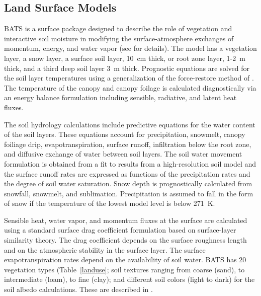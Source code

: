 \subsection{Land Surface Models}

 BATS is a surface package designed to describe
the role of vegetation and interactive soil moisture in modifying the
surface-atmosphere exchanges of momentum, energy, and water vapor (see
\cite{Dickinson_93} for details).  The model has a vegetation layer, a snow
layer, a surface soil layer, 10~cm thick, or root zone layer, 1-2~m thick, and a
third deep soil layer 3~m thick.  Prognostic equations are solved for the soil
layer temperatures using a generalization of the force-restore method of
\cite{Deardoff_78}.  The temperature of the canopy and canopy foilage is
calculated diagnostically via an energy balance formulation including sensible,
radiative, and latent heat fluxes.

The soil hydrology calculations include predictive equations for the water
content of the soil layers.  These equations account for precipitation,
snowmelt, canopy foiliage drip, evapotranspiration, surface runoff, infiltration
below the root zone, and diffusive exchange of water between soil layers.  The
soil water movement formulation is obtained from a fit to results from a
high-resolution soil model \cite{Dickinson_84} and the surface runoff rates are
expressed as functions of the precipitation rates and the degree of soil water
saturation.  Snow depth is prognostically calculated from snowfall, snowmelt,
and sublimation.  Precipitation is assumed to fall in the form of snow if the
temperature of the lowest model level is below 271~K.

Sensible heat, water vapor, and momentum fluxes at the surface are calculated
using a standard surface drag coefficient formulation based on surface-layer
similarity theory.  The drag coefficient depends on the surface roughness length
and on the atmospheric stability in the surface layer.  The surface
evapotranspiration rates depend on the availability of soil water.  \ac{BATS}
has 20 vegetation types (Table~\ref{landuse};  soil textures ranging from coarse
(sand), to intermediate (loam), to fine (clay);  and different soil colors
(light to dark) for the soil albedo calculations.  These are described in
\cite{Dickinson_86}. 

